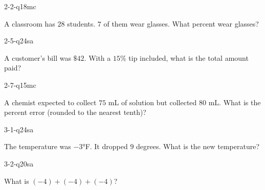 \begin{practiceQuestion}{2-2-q18}{mc}
\begin{questionText}
A classroom has $28$ students. $7$ of them wear glasses. What percent wear glasses?
\end{questionText}
\end{practiceQuestion}

\begin{practiceQuestion}{2-5-q24}{sa}
\begin{questionText}
A customer's bill was $\$42$. With a $15\%$ tip included, what is the total amount paid?
\end{questionText}
\end{practiceQuestion}

\begin{practiceQuestion}{2-7-q15}{mc}
\begin{questionText}
A chemist expected to collect $75$ mL of solution but collected $80$ mL. What is the percent error (rounded to the nearest tenth)?
\end{questionText}
\end{practiceQuestion}

\begin{practiceQuestion}{3-1-q24}{sa}
\begin{questionText}
The temperature was $-3°$F. It dropped $9$ degrees. What is the new temperature?
\end{questionText}
\end{practiceQuestion}

\begin{practiceQuestion}{3-2-q20}{sa}
\begin{questionText}
What is $(-4) + (-4) + (-4)$?
\end{questionText}
\end{practiceQuestion}

